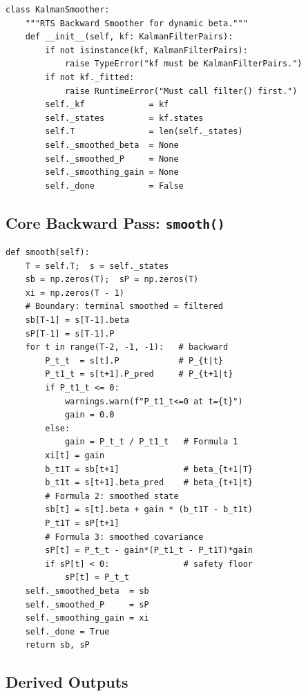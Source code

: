 \documentclass[10pt,a4paper,twocolumn]{article}
\begin{document}
\begin{tcolorbox}[codebox={Constructor --- \texttt{\_\_init\_\_()}}]
\begin{lstlisting}[style=pythonplain]
class KalmanSmoother:
    """RTS Backward Smoother for dynamic beta."""
    def __init__(self, kf: KalmanFilterPairs):
        if not isinstance(kf, KalmanFilterPairs):
            raise TypeError("kf must be KalmanFilterPairs.")
        if not kf._fitted:
            raise RuntimeError("Must call filter() first.")
        self._kf             = kf
        self._states         = kf.states
        self.T               = len(self._states)
        self._smoothed_beta  = None
        self._smoothed_P     = None
        self._smoothing_gain = None
        self._done           = False
\end{lstlisting}
\end{tcolorbox}

\subsection{Core Backward Pass: \texttt{smooth()}}

\begin{tcolorbox}[codebox={Backward Pass --- \texttt{smooth()}}]
\begin{lstlisting}[style=pythonplain]
def smooth(self):
    T = self.T;  s = self._states
    sb = np.zeros(T);  sP = np.zeros(T)
    xi = np.zeros(T - 1)
    # Boundary: terminal smoothed = filtered
    sb[T-1] = s[T-1].beta
    sP[T-1] = s[T-1].P
    for t in range(T-2, -1, -1):   # backward
        P_t_t  = s[t].P            # P_{t|t}
        P_t1_t = s[t+1].P_pred     # P_{t+1|t}
        if P_t1_t <= 0:
            warnings.warn(f"P_t1_t<=0 at t={t}")
            gain = 0.0
        else:
            gain = P_t_t / P_t1_t   # Formula 1
        xi[t] = gain
        b_t1T = sb[t+1]             # beta_{t+1|T}
        b_t1t = s[t+1].beta_pred    # beta_{t+1|t}
        # Formula 2: smoothed state
        sb[t] = s[t].beta + gain * (b_t1T - b_t1t)
        P_t1T = sP[t+1]
        # Formula 3: smoothed covariance
        sP[t] = P_t_t - gain*(P_t1_t - P_t1T)*gain
        if sP[t] < 0:               # safety floor
            sP[t] = P_t_t
    self._smoothed_beta  = sb
    self._smoothed_P     = sP
    self._smoothing_gain = xi
    self._done = True
    return sb, sP
\end{lstlisting}
\end{tcolorbox}

\subsection{Derived Outputs}
\end{document}
